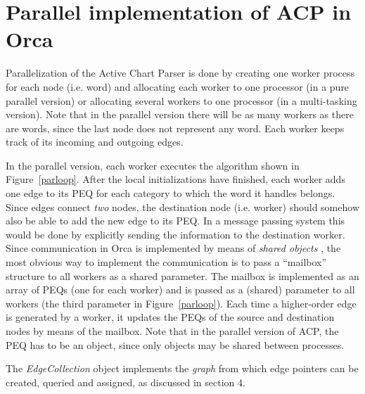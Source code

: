 \section{Parallel implementation of ACP in Orca}

Parallelization of the Active Chart Parser is done by creating one
worker process for each node (i.e. word) and allocating each worker to
one processor (in a pure parallel version) or allocating several
workers to one processor (in a multi-tasking version). Note that in the
parallel version there will be as many workers as there are words, since
the last node does not represent any word. Each worker keeps track of
its incoming and outgoing edges.

In the parallel version, each worker executes the algorithm shown
in Figure~\ref{parloop}. After the local initializations have finished,
each worker adds one edge to its PEQ for each category to which
the word it handles belongs. Since edges connect {\em two} nodes,
the destination node (i.e. worker) should somehow also be able to add
the new edge to its PEQ. In a message passing system
this would be done by explicitly sending the information to the
destination worker. Since communication in Orca is implemented by
means of {\em shared objects} \cite {orca}, the most obvious way to
implement the communication is to pass a ``mailbox'' structure to all
workers as a shared parameter. The mailbox is implemented as an array
of PEQs (one for each worker) and is passed as a (shared)
parameter to all workers (the third parameter in
Figure~\ref{parloop}). Each time a higher-order edge is generated by a
worker, it updates the PEQs of the source and
destination nodes by means of the mailbox. Note that in the parallel
version of ACP, the PEQ has to be an object, since only objects may be
shared between processes.

The {\em EdgeCollection} object implements the {\em graph} from which edge
pointers can be created, queried and assigned, as discussed in section
4. 

